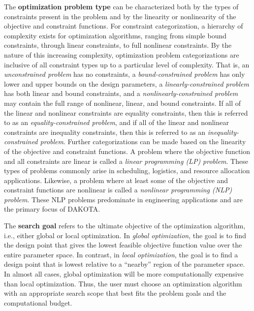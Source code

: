 The {\bf optimization problem type} can be characterized both by
the types of constraints present in the problem and by the linearity
or nonlinearity of the objective and constraint functions. For
constraint categorization, a hierarchy of complexity exists for
optimization algorithms, ranging from simple bound constraints,
through linear constraints, to full nonlinear constraints. By the
nature of this increasing complexity, optimization problem
categorizations are inclusive of all constraint types up to a
particular level of complexity. That is, an \emph{unconstrained
  problem} has no constraints, a \emph{bound-constrained problem} has
only lower and upper bounds on the design parameters, a
\emph{linearly-constrained problem} has both linear and bound
constraints, and a \emph{nonlinearly-constrained problem} may contain
the full range of nonlinear, linear, and bound constraints. If all of
the linear and nonlinear constraints are equality constraints, then
this is referred to as an \emph{equality-constrained problem}, and if
all of the linear and nonlinear constraints are inequality
constraints, then this is referred to as an
\emph{inequality-constrained problem}. Further categorizations can be
made based on the linearity of the objective and constraint functions.
A problem where the objective function and all constraints are linear
is called a \emph{linear programming (LP) problem}. These types of
problems commonly arise in scheduling, logistics, and resource
allocation applications. Likewise, a problem where at least some of
the objective and constraint functions are nonlinear is called a
\emph{nonlinear programming (NLP) problem}. These NLP problems
predominate in engineering applications and are the primary focus of
DAKOTA.

The {\bf search goal} refers to the ultimate objective of the
optimization algorithm, i.e., either global or local optimization. In
\emph{global optimization}, the goal is to find the design point that
gives the lowest feasible objective function value over the entire
parameter space. In contrast, in \emph{local optimization}, the goal
is to find a design point that is lowest relative to a ``nearby''
region of the parameter space. In almost all cases, global
optimization will be more computationally expensive than local
optimization. Thus, the user must choose an optimization algorithm
with an appropriate search scope that best fits the problem goals and
the computational budget.

